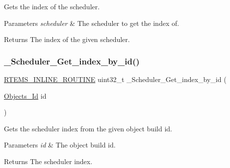 Gets the index of the scheduler. 


\begin{DoxyParams}{Parameters}
{\em scheduler} & The scheduler to get the index of.\\
\hline
\end{DoxyParams}
\begin{DoxyReturn}{Returns}
The index of the given scheduler. 
\end{DoxyReturn}
\mbox{\label{group__RTEMSScoreScheduler_ga6a59bd6a442d2c5acf247c66e1b21757}} 
\subsubsection{\texorpdfstring{\_Scheduler\_Get\_index\_by\_id()}{\_Scheduler\_Get\_index\_by\_id()}}
{\footnotesize\ttfamily \mbox{\hyperlink{group__RTEMSScoreBaseDefs_gac216239df231d5dbd15e3520b0b9313f}{R\+T\+E\+M\+S\+\_\+\+I\+N\+L\+I\+N\+E\+\_\+\+R\+O\+U\+T\+I\+NE}} uint32\+\_\+t \+\_\+\+Scheduler\+\_\+\+Get\+\_\+index\+\_\+by\+\_\+id (\begin{DoxyParamCaption}\item[{\mbox{\hyperlink{group__RTEMSScoreObject_ga5821f52a51072941bdd603e542d0863e}{Objects\+\_\+\+Id}}}]{id }\end{DoxyParamCaption})}



Gets the scheduler index from the given object build id. 


\begin{DoxyParams}{Parameters}
{\em id} & The object build id.\\
\hline
\end{DoxyParams}
\begin{DoxyReturn}{Returns}
The scheduler index. 
\end{DoxyReturn}
\mbox{\label{group__RTEMSScoreScheduler_gabc8aeee22cfaf3f6bf7d69b67d26635a}} 
